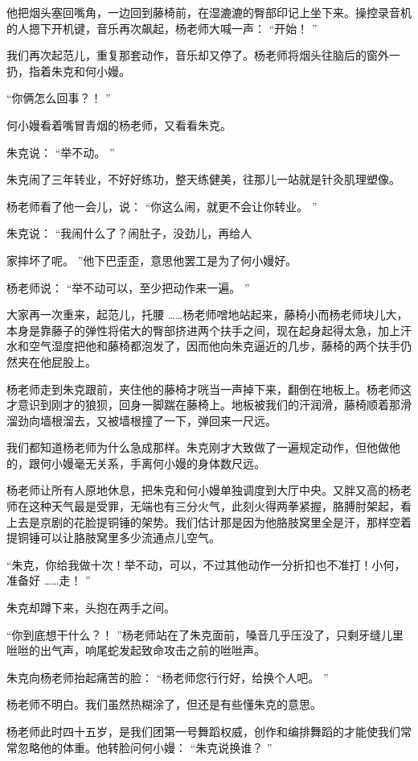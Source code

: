\documentclass[12pt,twoside,openany]{book}
\begin{document}
他把烟头塞回嘴角，一边回到藤椅前，在湿漉漉的臀部印记上坐下来。操控录音机的人摁下开机键，音乐再次飙起，杨老师大喊一声： “开始！ ”

我们再次起范儿，重复那套动作，音乐却又停了。杨老师将烟头往脑后的窗外一扔，指着朱克和何小嫚。

“你俩怎么回事？！ ”

何小嫚看着嘴冒青烟的杨老师，又看看朱克。

朱克说： “举不动。 ”

朱克闹了三年转业，不好好练功，整天练健美，往那儿一站就是针灸肌理塑像。

杨老师看了他一会儿，说： “你这么闹，就更不会让你转业。 ”

朱克说： “我闹什么了？闹肚子，没劲儿，再给人

家摔坏了呢。 ”他下巴歪歪，意思他罢工是为了何小嫚好。

杨老师说： “举不动可以，至少把动作来一遍。 ”

大家再一次重来，起范儿，托腰 ……杨老师噌地站起来，藤椅小而杨老师块儿大，本身是靠藤子的弹性将偌大的臀部挤进两个扶手之间，现在起身起得太急，加上汗水和空气湿度把他和藤椅都泡发了，因而他向朱克逼近的几步，藤椅的两个扶手仍然夹在他屁股上。

杨老师走到朱克跟前，夹住他的藤椅才咣当一声掉下来，翻倒在地板上。杨老师这才意识到刚才的狼狈，回身一脚踹在藤椅上。地板被我们的汗润滑，藤椅顺着那滑溜劲向墙根溜去，又被墙根撞了一下，弹回来一尺远。

我们都知道杨老师为什么急成那样。朱克刚才大致做了一遍规定动作，但他做他的，跟何小嫚毫无关系，手离何小嫚的身体数尺远。

杨老师让所有人原地休息，把朱克和何小嫚单独调度到大厅中央。又胖又高的杨老师在这种天气最是受罪，无端也有三分火气，此刻火得两拳紧握，胳膊肘架起，看上去是京剧的花脸提铜锤的架势。我们估计那是因为他胳肢窝里全是汗，那样空着提铜锤可以让胳肢窝里多少流通点儿空气。

“朱克，你给我做十次！举不动，可以，不过其他动作一分折扣也不准打！小何，准备好 ……走！ ”

朱克却蹲下来，头抱在两手之间。

“你到底想干什么？！ ”杨老师站在了朱克面前，嗓音几乎压没了，只剩牙缝儿里咝咝的出气声，响尾蛇发起致命攻击之前的咝咝声。

朱克向杨老师抬起痛苦的脸： “杨老师您行行好，给换个人吧。 ”

杨老师不明白。我们虽然热糊涂了，但还是有些懂朱克的意思。

杨老师此时四十五岁，是我们团第一号舞蹈权威，创作和编排舞蹈的才能使我们常常忽略他的体重。他转脸问何小嫚： “朱克说换谁？ ”
\end{document}
